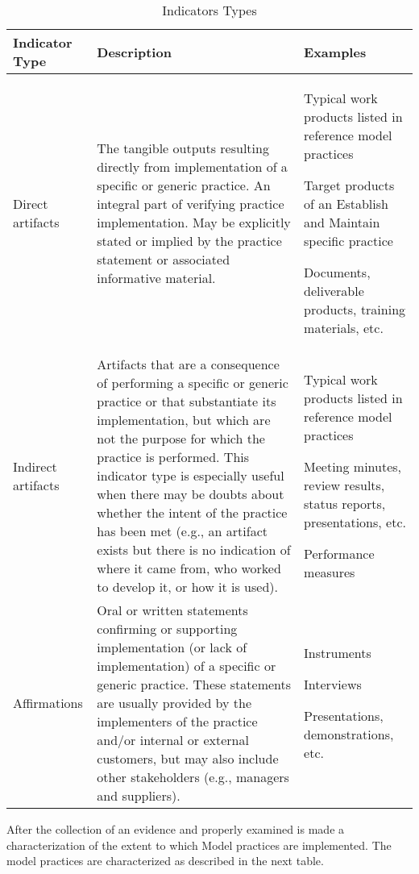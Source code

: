 \begin{table}[h]
	\centering
	\caption{Indicators Types}
\begin{tabular}{|p{2cm}|p{7cm}|p{4cm}|}
	\hline Indicator Type & Description & Examples\\
	\hline Direct artifacts & The tangible outputs resulting directly 
	from implementation of a specific or 
	generic practice. An integral part of 
	verifying practice implementation. May 
	be explicitly stated or implied by the 
	practice statement or associated 
	informative material. & Typical work products listed 
	in reference model practices 
	
	Target products of an 
	Establish and Maintain specific practice 
	
	Documents, deliverable 
	products, training materials, 
	etc. \\ 
	\hline Indirect artifacts & Artifacts that are a consequence of 
	performing a specific or generic practice 
	or that substantiate its implementation, 
	but which are not the purpose for which 
	the practice is performed. This indicator 
	type is especially useful when there may 
	be doubts about whether the intent of the 
	practice has been met (e.g., an artifact 
	exists but there is no indication of where 
	it came from, who worked to develop it, 
	or how it is used).  & Typical work products listed 
	in reference model practices 
	
	Meeting minutes, review 
	results, status reports, 
	presentations, etc. 
	
	Performance measures \\ 
	\hline Affirmations & Oral or written statements confirming or 
	supporting implementation (or lack of 
	implementation) of a specific or generic 
	practice. These statements are usually 
	provided by the implementers of the 
	practice and/or internal or external 
	customers, but may also include other 
	stakeholders (e.g., managers and 
	suppliers). &  Instruments 
	
	Interviews 
	
	Presentations, 
	demonstrations, etc.\\ 
	\hline 
\end{tabular}
\label{tab:Indicator}
\end{table}

 
\newpage
After the collection of an evidence and properly examined is made a characterization of the extent to which Model practices are implemented. The model practices are characterized as described in the next table.
\newline


